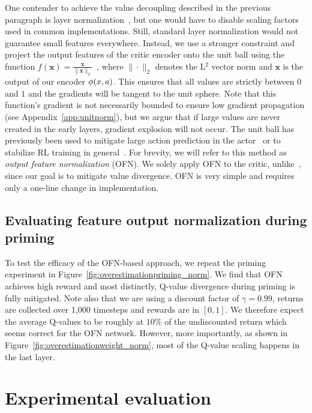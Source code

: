 One contender to achieve the value decoupling described in the previous paragraph is layer normalization~\parencite{ba2016layer}, but one would have to disable scaling factors used in common implementations. Still, standard layer normalization would not guarantee small features everywhere. Instead, we use a stronger constraint and project the output features of the critic encoder onto the unit ball using the function
$f(\mathbf{x}) = \frac{\mathbf{x} }{\|\mathbf{x}\|_2}$~\parencite{zhang2019root}, 
where $\|\cdot\|_2$ denotes the L$^2$ vector norm and $\mathbf{x}$ is the output of our encoder $\phi(x, a)$. This ensures that all values are strictly between $0$ and $1$ and the gradients will be tangent to the unit sphere. Note that this function's gradient is not necessarily bounded to ensure low gradient propagation (see Appendix~\ref{app:unitnorm}), but we argue that if large values are never created in the early layers, gradient explosion will not occur. The unit ball has previously been used to mitigate large action prediction in the actor~\parencite{wang2020striving} or to stabilize RL training in general~\parencite{bjorck2022is}. 
For brevity, we will refer to this method as {\em output feature normalization} (OFN). We solely apply OFN to the critic, unlike~\textcite{wang2020striving}, since our goal is to mitigate value divergence. OFN is very simple and requires only a one-line change in implementation.

\subsection{Evaluating feature output normalization during priming} \label{sec:evalmethod}

To test the efficacy of the OFN-based approach, we repeat the priming experiment in Figure~\ref{fig:overestimationpriming_norm}.
We find that OFN achieves high reward and most distinctly, Q-value divergence during priming is fully mitigated. 
Note also that we are using a discount factor of $\gamma = 0.99$, returns are collected over 1,000 timesteps and rewards are in $[0, 1]$. 
We therefore expect the average Q-values to be roughly at $10\%$ of the undiscounted return which seems correct for the OFN network. 
However, more importantly, as shown in Figure~\ref{fig:overestimationweight_norm}, most of the Q-value scaling happens in the last layer.

\section{Experimental evaluation}

